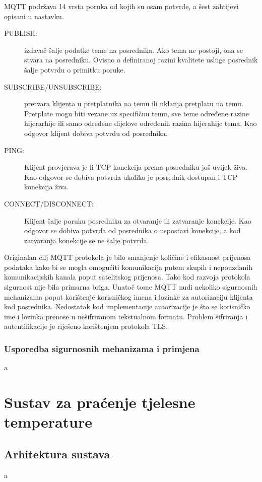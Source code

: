 \documentclass[times, utf8, diplomski]{fer}
\begin{document}
MQTT podržava 14 vrsta poruka od kojih su osam potvrde, a šest zahtijevi opisani u nastavku.
\begin{description}
    \item[PUBLISH:]izdavač šalje podatke teme na posrednika. Ako tema ne postoji, ona se stvara na posredniku. Ovisno o definiranoj razini kvalitete usluge posrednik šalje potvrdu o primitku poruke.
    \item[SUBSCRIBE/UNSUBSCRIBE:]pretvara klijenta u pretplatnika na temu ili uklanja pretplatu na temu. Pretplate mogu biti vezane uz specifičnu temu, sve teme određene razine hijerarhije ili samo određene dijelove određenih razina hijerahije tema. Kao odgovor klijent dobiva potvrdu od posrednika.
    \item[PING:] Klijent provjerava je li TCP konekcija prema posredniku još uvijek živa. Kao odgovor se dobiva potvrda ukoliko je posrednik dostupan i TCP konekcija živa.
    \item[CONNECT/DISCONNECT:] Klijent šalje poruku posredniku za otvaranje ili zatvaranje konekcije. Kao odgovor se dobiva potvrda od posrednika o uspostavi konekcije, a kod zatvaranja konekcije se ne šalje potvrda.
\end{description}

Originalan cilj MQTT protokola je bilo smanjenje količine i efikasnost prijenosa podataka kako bi se mogla omogućiti komunikacija putem skupih i nepouzdanih komunikacijskih kanala poput satelitskog prijenosa. Tako kod razvoja protokola sigurnost nije bila primarna briga. Unatoč tome MQTT nudi nekoliko sigurnosnih mehanizama poput korištenje korisničkog imena i lozinke za autorizaciju klijenta kod posrednika. Nedostatak kod implementacije autorizacije je što se korisničko ime i lozinka prenose u nešifriranom tekstualnom formatu. Problem šifriranja i autentifikacije je riješeno korištenjem protokola TLS.

\subsection{Usporedba sigurnosnih mehanizama i primjena}
a

\chapter{Sustav za praćenje tjelesne temperature}

\section{Arhitektura sustava}
a
\end{document}
